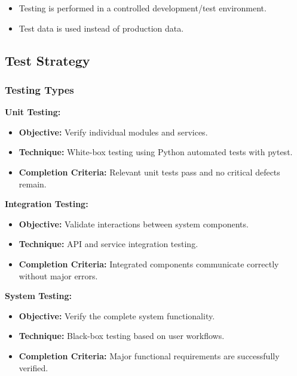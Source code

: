 \begin{itemize}[leftmargin=1.5em, nosep]
    \item Testing is performed in a controlled development/test environment.
    \item Test data is used instead of production data.
\end{itemize}

\subsection{Test Strategy}
\label{subsec:test-strategy}

\subsubsection{Testing Types}
\label{subsubsec:testing-types}

\textbf{Unit Testing:}
\begin{itemize}[leftmargin=1.5em, nosep]
    \item \textbf{Objective:} Verify individual modules and services.
    \item \textbf{Technique:} White-box testing using Python automated tests with pytest.
    \item \textbf{Completion Criteria:} Relevant unit tests pass and no critical defects remain.
\end{itemize}

\textbf{Integration Testing:}
\begin{itemize}[leftmargin=1.5em, nosep]
    \item \textbf{Objective:} Validate interactions between system components.
    \item \textbf{Technique:} API and service integration testing.
    \item \textbf{Completion Criteria:} Integrated components communicate correctly without major errors.
\end{itemize}

\textbf{System Testing:}
\begin{itemize}[leftmargin=1.5em, nosep]
    \item \textbf{Objective:} Verify the complete system functionality.
    \item \textbf{Technique:} Black-box testing based on user workflows.
    \item \textbf{Completion Criteria:} Major functional requirements are successfully verified.
\end{itemize}

